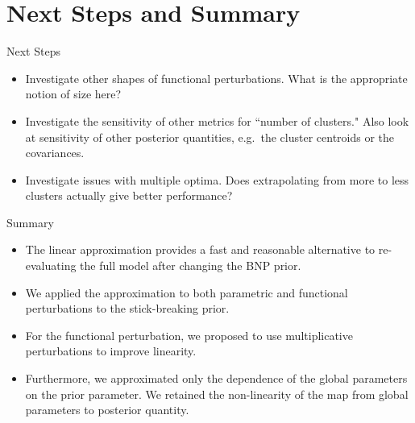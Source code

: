 \documentclass[10pt]{beamer}\usepackage[]{graphicx}\usepackage[]{color}
\begin{document}
\section{Next Steps and Summary}

\begin{frame}{Next Steps}

\begin{itemize}

\item Investigate other shapes of functional perturbations. What is the appropriate notion of size here?

\item Investigate the sensitivity of other metrics for ``number of clusters." Also look at sensitivity of other posterior quantities, e.g.\ the cluster centroids or the covariances. 

\item Investigate issues with multiple optima. Does extrapolating from more to less clusters actually give better performance?

\end{itemize}

\end{frame}

\begin{frame}{Summary}

\begin{itemize}

\item The linear approximation provides a fast and reasonable alternative to re-evaluating the full model after changing the BNP prior. 

\pause 

\item We applied the approximation to both parametric and functional perturbations to the stick-breaking prior.

\pause 

\item For the functional perturbation, we proposed to use multiplicative perturbations to improve linearity. 

\pause 

\item Furthermore, we approximated only the dependence of the global parameters on the prior parameter. We retained the non-linearity of the map from global parameters to posterior quantity.

\end{itemize}


\end{frame}
\end{document}

